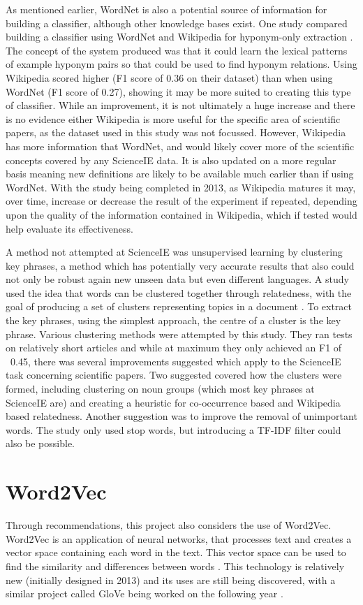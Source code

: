 As mentioned earlier, WordNet is also a potential source of information for building a classifier, although other knowledge bases exist. One study compared building a classifier using WordNet and Wikipedia for hyponym-only extraction \cite{Snow2013}. The concept of the system produced was that it could learn the lexical patterns of example hyponym pairs so that could be used to find hyponym relations. Using Wikipedia scored higher (F1 score of 0.36 on their dataset) than when using WordNet (F1 score of 0.27), showing it may be more suited to creating this type of classifier. While an improvement, it is not ultimately a huge increase and there is no evidence either Wikipedia is more useful for the specific area of scientific papers, as the dataset used in this study was not focussed. However, Wikipedia has more information that WordNet, and would likely cover more of the scientific concepts covered by any ScienceIE data. It is also updated on a more regular basis meaning new definitions are likely to be available much earlier than if using WordNet. With the study being completed in 2013, as Wikipedia matures it may, over time, increase or decrease the result of the experiment if repeated, depending upon the quality of the information contained in Wikipedia, which if tested would help evaluate its effectiveness.

A method not attempted at ScienceIE was unsupervised learning by clustering key phrases, a method which has potentially very accurate results that also could not only be robust again new unseen data but even different languages. A study used the idea that words can be clustered together through relatedness, with the goal of producing a set of clusters representing topics in a document \cite{Liu2009}. To extract the key phrases, using the simplest approach, the centre of a cluster is the key phrase. Various clustering methods were attempted by this study. They ran tests on relatively short articles and while at maximum they only achieved an F1 of ~0.45, there was several improvements suggested which apply to the ScienceIE task concerning scientific papers. Two suggested covered how the clusters were formed, including clustering on noun groups (which most key phrases at ScienceIE are) and creating a heuristic for co-occurrence based and Wikipedia based relatedness. Another suggestion was to improve the removal of unimportant words. The study only used stop words, but introducing a TF-IDF filter could also be possible.

\section{Word2Vec}
Through recommendations, this project also considers the use of Word2Vec. Word2Vec is an application of neural networks, that processes text and creates a vector space containing each word in the text. This vector space can be used to find the similarity and differences between words \cite{Mikolov2013}. This technology is relatively new (initially designed in 2013) and its uses are still being discovered, with a similar project called GloVe being worked on the following year \cite{Pennington2014}.

